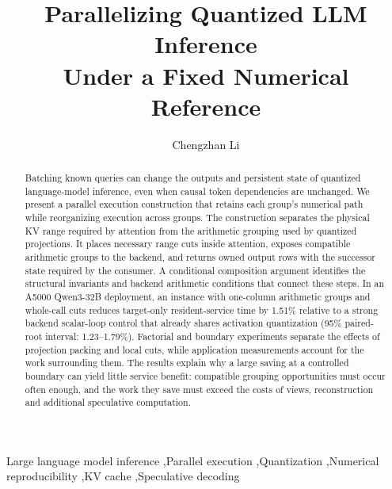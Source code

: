 \documentclass[a4paper,fleqn]{cas-dc}
\begin{document}
\let\WriteBookmarks\relax
{}
\title[mode=title]{Parallelizing Quantized LLM Inference\texorpdfstring{\\}{ }Under a Fixed Numerical Reference}
\author[1]{Chengzhan Li}
\cormark[1]
\begin{abstract}
Batching known queries can change the outputs and persistent state of quantized language-model inference, even when causal token dependencies are unchanged. We present a parallel execution construction that retains each group's numerical path while reorganizing execution across groups. The construction separates the physical KV range required by attention from the arithmetic grouping used by quantized projections. It places necessary range cuts inside attention, exposes compatible arithmetic groups to the backend, and returns owned output rows with the successor state required by the consumer. A conditional composition argument identifies the structural invariants and backend arithmetic conditions that connect these steps. In an A5000 Qwen3-32B deployment, an instance with one-column arithmetic groups and whole-call cuts reduces target-only resident-service time by 1.51\% relative to a strong backend scalar-loop control that already shares activation quantization (95\% paired-root interval: 1.23--1.79\%). Factorial and boundary experiments separate the effects of projection packing and local cuts, while application measurements account for the work surrounding them. The results explain why a large saving at a controlled boundary can yield little service benefit: compatible grouping opportunities must occur often enough, and the work they save must exceed the costs of views, reconstruction and additional speculative computation.
\end{abstract}
\begin{keywords}
Large language model inference \sep Parallel execution \sep Quantization \sep Numerical reproducibility \sep KV cache \sep Speculative decoding
\end{keywords}
\maketitle
{}









\balance


\end{document}
